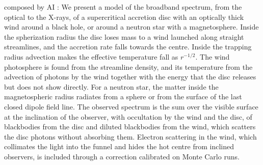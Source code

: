 
 composed by AI : We present a model of the broadband spectrum, from the optical to the X-rays, of a supercritical accretion disc with an optically thick wind around a black hole, or around a neutron star with a magnetosphere.
Inside the spherization radius the disc loses mass to a wind launched along straight streamlines, and the accretion rate falls towards the centre.
Inside the trapping radius advection makes the effective temperature fall as $r^{-1/2}$.
The wind photosphere is found from the streamline density, and its temperature from the advection of photons by the wind together with the energy that the disc releases but does not show directly.
For a neutron star, the matter inside the magnetospheric radius radiates from a sphere or from the surface of the last closed dipole field line.
The observed spectrum is the sum over the visible surface at the inclination of the observer, with occultation by the wind and the disc, of blackbodies from the disc and diluted blackbodies from the wind, which scatters the disc photons without absorbing them.
Electron scattering in the wind, which collimates the light into the funnel and hides the hot centre from inclined observers, is included through a correction calibrated on Monte Carlo runs.
